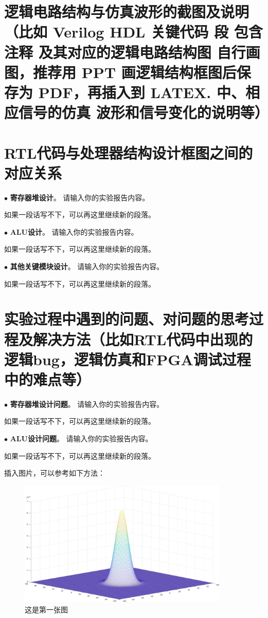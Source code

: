 \documentclass[11pt]{article}
\begin{document}


\section{逻辑电路结构与仿真波形的截图及说明（比如 Verilog HDL 关键代码
段 {包含注释} 及其对应的逻辑电路结构图 {自行画图，推荐用 PPT
画逻辑结构框图后保存为 PDF，再插入到 LATEX. 中}、相应信号的仿真
波形和信号变化的说明等）}

\section{RTL代码与处理器结构设计框图之间的对应关系}

\noindent
$\bullet$
\textbf{寄存器堆设计}。
请输入你的实验报告内容。

如果一段话写不下，可以再这里继续新的段落。

\vspace{1ex}

\noindent
$\bullet$
\textbf{ALU设计}。
请输入你的实验报告内容。

如果一段话写不下，可以再这里继续新的段落。

\vspace{1ex}

\noindent
$\bullet$
\textbf{其他关键模块设计}。
请输入你的实验报告内容。

如果一段话写不下，可以再这里继续新的段落。

\section{实验过程中遇到的问题、对问题的思考过程及解决方法（比如RTL代码中出现的逻辑bug，逻辑仿真和FPGA调试过程中的难点等）}

\noindent
$\bullet$
\textbf{寄存器堆设计问题}。
请输入你的实验报告内容。

如果一段话写不下，可以再这里继续新的段落。

\vspace{1ex}

\noindent
$\bullet$
\textbf{ALU设计问题}。
请输入你的实验报告内容。

如果一段话写不下，可以再这里继续新的段落。

插入图片，可以参考如下方法：
\begin{figure}[h]
  \centering
  \includegraphics[width=10cm]{fig/Gaussian.pdf}
  \caption{这是第一张图}
\end{figure}
\end{document}
